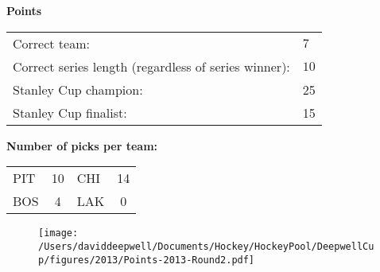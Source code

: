 \documentclass[10pt]{article}
\begin{document}
{\bf Points}\\
\begin{minipage}{12cm}
    \begin{tabular}{l l}
        Correct team:	& $7$\\
        Correct series length (regardless of series winner):	& $10$\\
        Stanley Cup champion:	& 25\\
        Stanley Cup finalist:	& 15\\
    \end{tabular}

    \vspace{1cm}
    {\bf Number of picks per team:}\\
    \begin{tabular}{lc | lc }
        PIT & 10 & CHI & 14 \\
        BOS & 4 & LAK & 0 \\
    \end{tabular}
\end{minipage}
\begin{minipage}[t]{13cm}
    \begin{figure}[H]
        \vspace{-2.5cm}
        \texttt{[image: /Users/daviddeepwell/Documents/Hockey/HockeyPool/DeepwellCup/figures/2013/Points-2013-Round2.pdf]}
    \end{figure}
\end{minipage}
\end{document}
